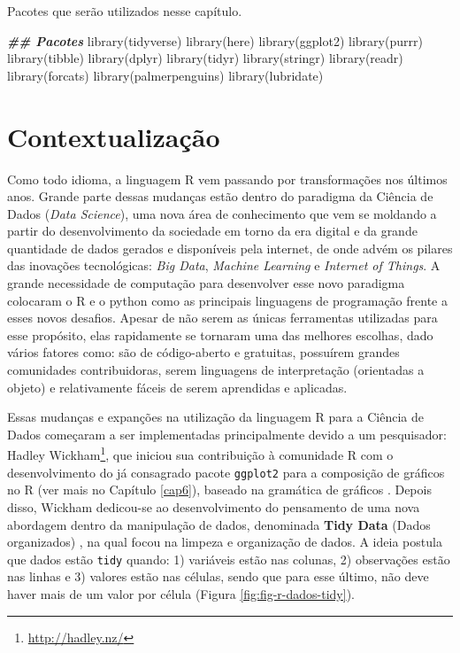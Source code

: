 \documentclass[
]{book}
\newenvironment{Shaded}{\begin{snugshade}}{\end{snugshade}}
\newcommand{\DocumentationTok}[1]{\textcolor[rgb]{0.37,0.37,0.37}{\textbf{\textit{#1}}}}
\newcommand{\FunctionTok}[1]{\textcolor[rgb]{0,0,0}{#1}}
\newcommand{\NormalTok}[1]{#1}
\renewcommand{\href}[2]{#2\footnote{\url{#1}}}
\begin{document}
Pacotes que serão utilizados nesse capítulo.

\begin{Shaded}
\begin{Highlighting}[]
\DocumentationTok{\#\# Pacotes}
\FunctionTok{library}\NormalTok{(tidyverse)}
\FunctionTok{library}\NormalTok{(here)}
\FunctionTok{library}\NormalTok{(ggplot2)}
\FunctionTok{library}\NormalTok{(purrr)}
\FunctionTok{library}\NormalTok{(tibble)}
\FunctionTok{library}\NormalTok{(dplyr)}
\FunctionTok{library}\NormalTok{(tidyr)}
\FunctionTok{library}\NormalTok{(stringr)}
\FunctionTok{library}\NormalTok{(readr)}
\FunctionTok{library}\NormalTok{(forcats)}
\FunctionTok{library}\NormalTok{(palmerpenguins)}
\FunctionTok{library}\NormalTok{(lubridate)}
\end{Highlighting}
\end{Shaded}

\hypertarget{contextualizauxe7uxe3o-1}{%
\section{Contextualização}\label{contextualizauxe7uxe3o-1}}

Como todo idioma, a linguagem R vem passando por transformações nos últimos anos. Grande parte dessas mudanças estão dentro do paradigma da Ciência de Dados (\emph{Data Science}), uma nova área de conhecimento que vem se moldando a partir do desenvolvimento da sociedade em torno da era digital e da grande quantidade de dados gerados e disponíveis pela internet, de onde advém os pilares das inovações tecnológicas: \emph{Big Data}, \emph{Machine Learning} e \emph{Internet of Things}. A grande necessidade de computação para desenvolver esse novo paradigma colocaram o R e o python como as principais linguagens de programação frente a esses novos desafios. Apesar de não serem as únicas ferramentas utilizadas para esse propósito, elas rapidamente se tornaram uma das melhores escolhas, dado vários fatores como: são de código-aberto e gratuitas, possuírem grandes comunidades contribuidoras, serem linguagens de interpretação (orientadas a objeto) e relativamente fáceis de serem aprendidas e aplicadas.

Essas mudanças e expanções na utilização da linguagem R para a Ciência de Dados começaram a ser implementadas principalmente devido a um pesquisador: \href{http://hadley.nz/}{Hadley Wickham}, que iniciou sua contribuição à comunidade R com o desenvolvimento do já consagrado pacote \texttt{ggplot2} \citep{wickham2016} para a composição de gráficos no R (ver mais no Capítulo \ref{cap6}), baseado na gramática de gráficos \citep{wilkinson2005}. Depois disso, Wickham dedicou-se ao desenvolvimento do pensamento de uma nova abordagem dentro da manipulação de dados, denominada \textbf{Tidy Data} (Dados organizados) \citep{wickham2014}, na qual focou na limpeza e organização de dados. A ideia postula que dados estão \texttt{tidy} quando: 1) variáveis estão nas colunas, 2) observações estão nas linhas e 3) valores estão nas células, sendo que para esse último, não deve haver mais de um valor por célula (Figura \ref{fig:fig-r-dados-tidy}).
\end{document}
